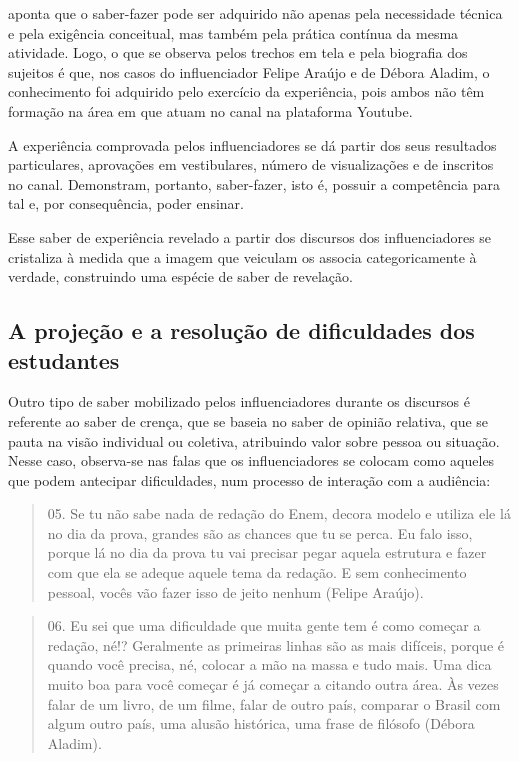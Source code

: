 \documentclass[portuguese]{textolivre}
\begin{document}
\textcite{charaudeau_conquista_2020} aponta que o saber-fazer pode ser adquirido não apenas pela necessidade técnica e pela exigência conceitual, mas também pela prática contínua da mesma atividade. Logo, o que se observa pelos trechos em tela e pela biografia dos sujeitos é que, nos casos do influenciador Felipe Araújo e de Débora Aladim, o conhecimento foi adquirido pelo exercício da experiência, pois ambos não têm formação na área em que atuam no canal na plataforma Youtube. 

A experiência comprovada pelos influenciadores se dá partir dos seus resultados particulares, aprovações em vestibulares, número de visualizações e de inscritos no canal. Demonstram, portanto, saber-fazer, isto é, possuir a competência para tal e, por consequência, poder ensinar.

Esse saber de experiência revelado a partir dos discursos dos influenciadores se cristaliza à medida que a imagem que veiculam os associa categoricamente à verdade, construindo uma espécie de saber de revelação.

\subsection{A projeção e a resolução de dificuldades dos estudantes}\label{sec-organizacao-latex}
Outro tipo de saber mobilizado pelos influenciadores durante os discursos é referente ao saber de crença, que se baseia no saber de opinião relativa, que se pauta na visão individual ou coletiva, atribuindo valor sobre pessoa ou situação. Nesse caso, observa-se nas falas que os influenciadores se colocam como aqueles que podem antecipar dificuldades, num processo de interação com a audiência:

\begin{quote}
   05. Se tu não sabe nada de redação do Enem, decora modelo e utiliza ele lá no dia da prova, grandes são as chances que tu se perca. Eu falo isso, porque lá no dia da prova tu vai precisar pegar aquela estrutura e fazer com que ela se adeque aquele tema da redação. E sem conhecimento pessoal, vocês vão fazer isso de jeito nenhum (Felipe Araújo).
\end{quote}

\begin{quote}
  06. Eu sei que uma dificuldade que muita gente tem é como começar a redação, né!? Geralmente as primeiras linhas são as mais difíceis, porque é quando você precisa, né, colocar a mão na massa e tudo mais. Uma dica muito boa para você começar é já começar a citando outra área. Às vezes falar de um livro, de um filme, falar de outro país, comparar o Brasil com algum outro país, uma alusão histórica, uma frase de filósofo (Débora Aladim).
\end{quote}
\end{document}
